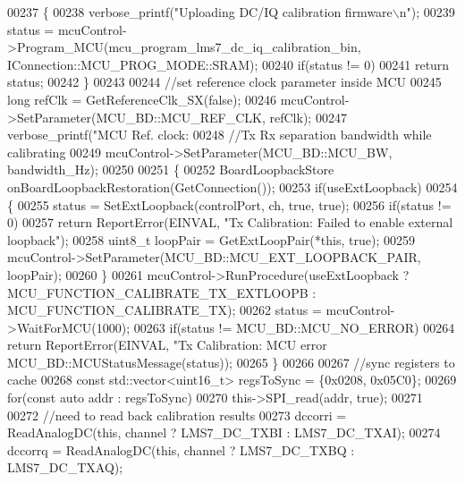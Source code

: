 \begin{DoxyCode}
{{{{{00237     \{
00238         verbose_printf(\textcolor{stringliteral}{"Uploading DC/IQ calibration firmware\(\backslash\)n"});
00239         status = mcuControl->Program\_MCU(mcu_program_lms7_dc_iq_calibration_bin, 
      IConnection::MCU\_PROG\_MODE::SRAM);
00240         \textcolor{keywordflow}{if}(status != 0)
00241             \textcolor{keywordflow}{return} status;
00242     \}
00243 
00244     \textcolor{comment}{//set reference clock parameter inside MCU}
00245     \textcolor{keywordtype}{long} refClk = GetReferenceClk\_SX(\textcolor{keyword}{false});
00246     mcuControl->SetParameter(MCU_BD::MCU_REF_CLK, refClk);
00247     verbose_printf(\textcolor{stringliteral}{"MCU Ref. clock: %
00248     \textcolor{comment}{//Tx Rx separation bandwidth while calibrating}
00249     mcuControl->SetParameter(MCU_BD::MCU_BW, bandwidth\_Hz);
00250 
00251     \{
00252         BoardLoopbackStore onBoardLoopbackRestoration(GetConnection());
00253         \textcolor{keywordflow}{if}(useExtLoopback)
00254         \{
00255             status = SetExtLoopback(controlPort, ch, \textcolor{keyword}{true}, \textcolor{keyword}{true});
00256             \textcolor{keywordflow}{if}(status != 0)
00257                 \textcolor{keywordflow}{return} ReportError(EINVAL, \textcolor{stringliteral}{"Tx Calibration: Failed to enable external loopback"});
00258             uint8\_t loopPair = GetExtLoopPair(*\textcolor{keyword}{this}, \textcolor{keyword}{true});
00259             mcuControl->SetParameter(MCU_BD::MCU_EXT_LOOPBACK_PAIR, loopPair);
00260         \}
00261         mcuControl->RunProcedure(useExtLoopback ? 
      MCU_FUNCTION_CALIBRATE_TX_EXTLOOPB : MCU_FUNCTION_CALIBRATE_TX);
00262         status = mcuControl->WaitForMCU(1000);
00263         \textcolor{keywordflow}{if}(status != MCU_BD::MCU_NO_ERROR)
00264             \textcolor{keywordflow}{return} ReportError(EINVAL, \textcolor{stringliteral}{"Tx Calibration: MCU error %
      MCU\_BD::MCUStatusMessage(status));
00265     \}
00266 
00267     \textcolor{comment}{//sync registers to cache}
00268     \textcolor{keyword}{const} std::vector<uint16\_t> regsToSync = \{0x0208, 0x05C0\};
00269     \textcolor{keywordflow}{for}(\textcolor{keyword}{const} \textcolor{keyword}{auto} addr : regsToSync)
00270         this->SPI_read(addr, \textcolor{keyword}{true});
00271 
00272     \textcolor{comment}{//need to read back calibration results}
00273     dccorri = ReadAnalogDC(\textcolor{keyword}{this}, channel ? LMS7_DC_TXBI : LMS7_DC_TXAI);
00274     dccorrq = ReadAnalogDC(\textcolor{keyword}{this}, channel ? LMS7_DC_TXBQ : LMS7_DC_TXAQ);
}}}}}}}
\end{DoxyCode}
